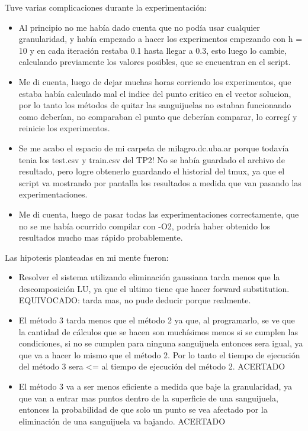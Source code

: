 \documentclass[a4paper]{article}
\begin{document}
Tuve varias complicaciones durante la experimentación:
\begin{itemize}
\item Al principio no me había dado cuenta que no podía usar cualquier granularidad, y había empezado a hacer los experimentos empezando con h = 10 y en cada iteración restaba 0.1 hasta llegar a 0.3, esto luego lo cambie, calculando previamente los valores posibles, que se encuentran en el script.
\item Me di cuenta, luego de dejar muchas horas corriendo los experimentos, que estaba había calculado mal el indice del punto critico en el vector solucion, por lo tanto los métodos de quitar las sanguijuelas no estaban funcionando como deberían, no comparaban el punto que deberían comparar, lo corregí y reinicie los experimentos.
\item Se me acabo el espacio de mi carpeta de milagro.dc.uba.ar porque todavía tenia los test.csv y train.csv del TP2! No se había guardado el archivo de resultado, pero logre obtenerlo guardando el historial del tmux, ya que el script va mostrando por pantalla los resultados a medida que van pasando las experimentaciones.
\item Me di cuenta, luego de pasar todas las experimentaciones correctamente, que no se me había ocurrido compilar con -O2, podría haber obtenido los resultados mucho mas rápido probablemente.
\end{itemize}

Las hipotesis planteadas en mi mente fueron:
\begin{itemize}
\item Resolver el sistema utilizando eliminación gaussiana tarda menos que la descomposición LU, ya que el ultimo tiene que hacer forward substitution. EQUIVOCADO: tarda mas, no pude deducir porque realmente.
\item El método 3 tarda menos que el método 2 ya que, al programarlo, se ve que la cantidad de cálculos que se hacen son muchísimos menos si se cumplen las condiciones, si no se cumplen para ninguna sanguijuela entonces sera igual, ya que va a hacer lo mismo que el método 2. Por lo tanto el tiempo de ejecución del método 3 sera \textless = al tiempo de ejecución del método 2. ACERTADO
\item El método 3 va a ser menos eficiente a medida que baje la granularidad, ya que van a entrar mas puntos dentro de la superficie de una sanguijuela, entonces la probabilidad de que solo un punto se vea afectado por la eliminación de una sanguijuela va bajando. ACERTADO
\end{itemize}
\end{document}
